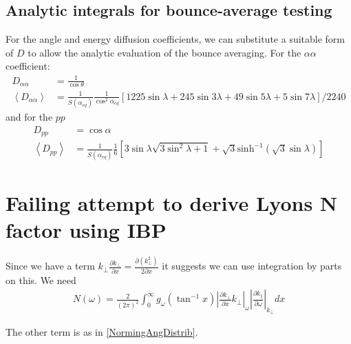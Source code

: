\documentclass[]{article}
\begin{document}
\subsection{Analytic integrals for bounce-average testing}
For the angle and energy diffusion coefficients, we can substitute a suitable form of $D$ to allow the analytic evaluation of the bounce averaging. 
For the $\alpha \alpha$ coefficient:
\begin{align}
D_{\alpha\alpha} &= \frac{1}{\cos \theta}\\
\left< D_{\alpha \alpha}\right> &= \frac{1}{S(\alpha_{eq})} \frac{1}{\cos^2 \alpha_{eq}} \left[ 1225 \sin \lambda + 245 \sin 3\lambda + 49 \sin 5\lambda + 5 \sin 7\lambda\right]/2240
\end{align}
and for the $p p$
\begin{align}
D_{p p} & = \cos \alpha\\
\left< D_{p p}\right> &= \frac{1}{S(\alpha_{eq})} \frac{1}{6} \left[ 3 \sin \lambda \sqrt{3 \sin^2 \lambda + 1} + \sqrt{3} \mathrm{sinh}^{-1}(\sqrt{3}\sin\lambda)\right]
\end{align}

\newpage
\appendix
\section{Failing attempt to derive Lyons N factor using IBP}
Since we have a term $k_\perp  \frac{\partial k_\perp}{\partial x}= \frac{\partial (k_\perp^2)}{2 \partial x}$ it suggests we can use integration by parts on this. We need
\begin{align}
N(\omega) = \frac{2}{(2\pi)^2} \int_0^\infty g_\omega( \tan^{-1} x ) \left| \frac{\partial k_\perp}{\partial x}k_\perp\right|_\omega \left| \frac{\partial k_\parallel}{\partial \omega}\right|_{k_\perp}   d x
\end{align}

The other term is as in \ref{NormingAngDistrib}.
\end{document}
